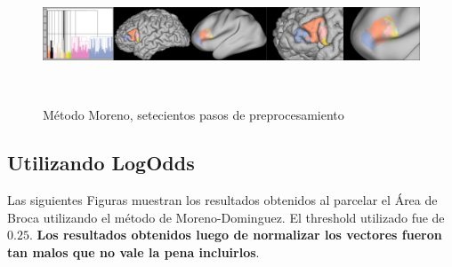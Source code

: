 \begin{figure}[h!]
\begin{minipage}[b]{\textwidth}
\end{minipage} ~

\begin{minipage}[b]{\textwidth}
    \includegraphics[width=\textwidth]{img/broca/moreno_750.png}
    \caption{M\'etodo Moreno, setecientos pasos de preprocesamiento}

\end{minipage} ~

\end{figure} 


\subsection{Utilizando LogOdds}

Las siguientes Figuras muestran los resultados obtenidos al parcelar el \'Area
de Broca utilizando el m\'etodo de Moreno-Dominguez. El threshold utilizado fue
de $0.25$. \textbf{Los resultados obtenidos luego de normalizar los vectores 
fueron tan malos que no vale la pena incluirlos}.

